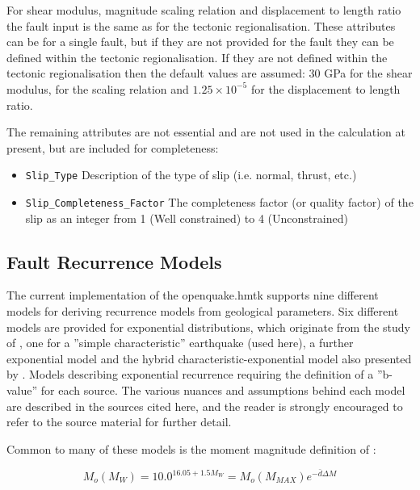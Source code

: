 For shear modulus, magnitude scaling relation and displacement to length ratio the fault input is the same as for the tectonic regionalisation. These attributes can be for a single fault, but if they are not provided for the fault they can be defined within the tectonic regionalisation. If they are not defined within the tectonic regionalisation then the default values are assumed: 30 GPa for the shear modulus, \textcite{wells1994} for the scaling relation and $1.25\times10^{-5}$ for the displacement to length ratio. 

The remaining attributes are not essential and are not used in the calculation at present, but are included for completeness:
\begin{itemize}
\item \verb=Slip_Type= Description of the type of slip (i.e. normal, thrust, etc.)
\item \verb=Slip_Completeness_Factor= The completeness factor (or quality factor) of the slip as an integer from 1 (Well constrained) to 4 (Unconstrained) 
\end{itemize}


\subsection{Fault Recurrence Models}

The current implementation of the openquake.hmtk supports nine different models for deriving recurrence models from geological parameters. Six different models are provided for exponential distributions, which originate from the study of \textcite{AndersonLuco1983}, one for a ''simple characteristic'' earthquake (used here), a further exponential model \parencite{YoungsCoppersmith1985} and the hybrid characteristic-exponential model also presented by \textcite{YoungsCoppersmith1985}. Models describing exponential recurrence requiring the definition of a ''b-value'' for each source. The various nuances and assumptions behind each model are described in the sources cited here, and the reader is strongly encouraged to refer to the source material for further detail.

Common to many of these models is the moment magnitude definition of \textcite{HanksKanamori1979}:

\begin{equation}
M_o \left( {M_W} \right) = 10.0 ^{16.05 + 1.5 M_W} = M_o \left( {M_{MAX}} \right) e^{-\bar{d} \Delta M}
\end{equation}

